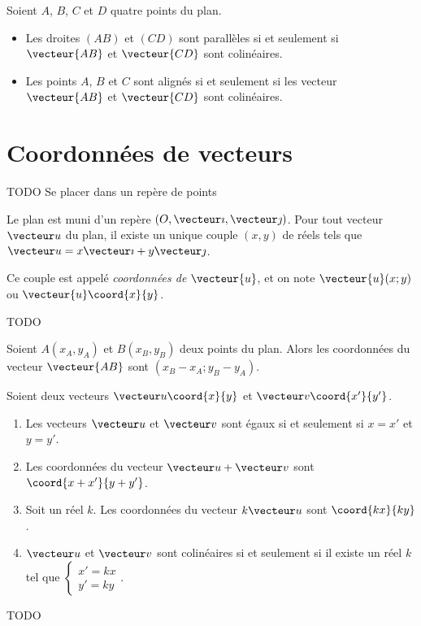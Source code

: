 \begin{propriete}
  Soient $A$, $B$, $C$ et $D$ quatre points du plan.
  \begin{itemize}
    \item Les droites $(AB)$ et $(CD)$ sont parallèles si et seulement si $\vecteur{AB}$ et $\vecteur{CD}$ sont colinéaires.
    \item Les points $A$, $B$ et $C$ sont alignés si et seulement si les vecteur $\vecteur{AB}$ et $\vecteur{CD}$ sont colinéaires.
  \end{itemize}
\end{propriete}

\section{Coordonnées de vecteurs}

TODO Se placer dans un repère de points

\begin{definition}
  Le plan est muni d'un repère $(O, \vecteur\imath,
  \vecteur\jmath)$. Pour tout vecteur $\vecteur u$ du plan, il existe un unique
  couple $(x,y)$ de réels tels que $\vecteur
  u=x\vecteur\imath+y\vecteur\jmath$.

Ce couple est appelé \emph{coordonnées de $\vecteur{u}$}, et on note
$\vecteur{u}(x;y)$ ou
$\vecteur{u}\coord{x}{y}$.
\end{definition}

\begin{definition}
  TODO
\end{definition}

\begin{propriete}
  Soient $A(x_A,y_A)$ et $B(x_B,y_B)$ deux points du plan. Alors les coordonnées du vecteur $\vecteur{AB}$ sont $(x_B-x_A;y_B-y_A)$.
\end{propriete}

\begin{propriete} Soient deux vecteurs $\vecteur u\coord{x}{y}$ et $\vecteur v\coord{x'}{y'}$.
  \begin{enumerate}
  \item Les vecteurs $\vecteur u$ et $\vecteur v$ sont égaux si et seulement si $x=x'$ et $y=y'$.
  \item Les coordonnées du vecteur $\vecteur u+\vecteur v$ sont $\coord{x+x'}{y+y'}$.
  \item Soit un réel $k$. Les coordonnées du vecteur $k\vecteur u$ sont $\coord{kx}{ky}$.
\item $\vecteur u$ et $\vecteur v$ sont colinéaires si et seulement si il existe un réel $k$ tel que $\left\{\begin{array}{l}x'=kx\\y'=ky\end{array}\right.$.
\end{enumerate}
\end{propriete}

\begin{propriete}
  TODO
\end{propriete}
